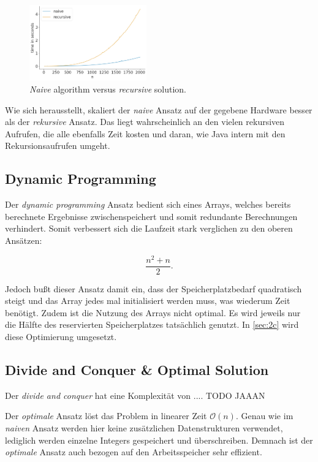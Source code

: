 \documentclass[10pt]{article}
\begin{document}
    \begin{figure}[ht]
        \centering
        \includegraphics[width=0.45\textwidth]{../naive_vs_rec_times.png}
        \caption{\textit{Naive} algorithm versus \textit{recursive} solution.}
        \label{fig:naiv_vs_rec}
    \end{figure}

        \newpage
    Wie sich herausstellt, skaliert der \textit{naive} Ansatz auf der gegebene Hardware besser als der \textit{rekursive} Ansatz.
    Das liegt wahrscheinlich an den vielen rekursiven Aufrufen, die alle ebenfalls Zeit kosten und daran, wie Java 
    intern mit den Rekursionsaufrufen umgeht. 

    \subsection{Dynamic Programming}\label{sec:dynamic}
    Der \textit{dynamic programming} Ansatz bedient sich eines Arrays, welches bereits berechnete Ergebnisse zwischenspeichert und somit
    redundante Berechnungen verhindert. Somit verbessert sich die Laufzeit stark verglichen zu den oberen Ansätzen:

    \[
        \frac{n^{2}+n}{2} 
    .\]

    Jedoch bu\ss t dieser Ansatz damit ein, dass der Speicherplatzbedarf quadratisch steigt und das Array jedes mal 
    initialisiert werden muss, was wiederum Zeit benötigt. Zudem ist die Nutzung des Arrays nicht optimal. Es wird jeweils nur die 
    Hälfte des reservierten Speicherplatzes tatsächlich genutzt. In \ref{sec:2c} wird diese Optimierung 
    umgesetzt.

    \subsection{Divide and Conquer \& Optimal Solution}
   Der \textit{divide and conquer} hat eine Komplexität von ....
       TODO JAAAN



       Der \textit{optimale} Ansatz löst das Problem in linearer Zeit $\mathcal{O}(n)$. 
   Genau wie im \textit{naiven} Ansatz werden hier keine zusätzlichen Datenstrukturen verwendet,
   lediglich werden einzelne Integers gespeichert und überschreiben. Demnach ist der \textit{optimale}
   Ansatz auch bezogen auf den Arbeitsspeicher sehr effizient. 
\end{document}
